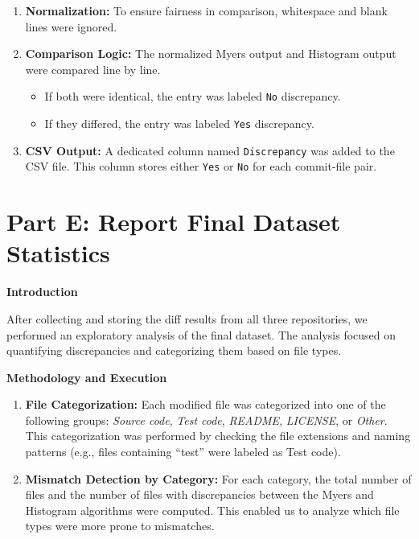 \documentclass[12pt, a4paper]{report}
\newcommand{\sectionbar}[1]{%
  \vspace{0.6\baselineskip}%
  \noindent
  \colorbox{sectionbar}{%
    \parbox{\dimexpr\linewidth-2\fboxsep\relax}{%
      \textbf{\Large\textsf{#1}}%
    }%
  }%
  \vspace{0.6\baselineskip}
}
\begin{document}
\begin{enumerate}
    \item \textbf{Normalization:}  
    To ensure fairness in comparison, whitespace and blank lines were ignored.

    \item \textbf{Comparison Logic:}  
    The normalized Myers output and Histogram output were compared line by line.  
    \begin{itemize}
        \item If both were identical, the entry was labeled \texttt{No} discrepancy.  
        \item If they differed, the entry was labeled \texttt{Yes} discrepancy.  
    \end{itemize}

    \item \textbf{CSV Output:}  
    A dedicated column named \texttt{Discrepancy} was added to the CSV file. This column stores either \texttt{Yes} or \texttt{No} for each commit-file pair.

\end{enumerate}

\section{Part E: Report Final Dataset Statistics}

\sectionbar{Introduction}

After collecting and storing the diff results from all three repositories, we performed an exploratory analysis of the final dataset. The analysis focused on quantifying discrepancies and categorizing them based on file types.

\sectionbar{Methodology and Execution}

\begin{enumerate}
    \item \textbf{File Categorization:}  
        Each modified file was categorized into one of the following groups: 
        \textit{Source code}, \textit{Test code}, \textit{README}, \textit{LICENSE}, or \textit{Other}.  
        This categorization was performed by checking the file extensions and naming patterns (e.g., files containing ``test'' were labeled as Test code).

    \item \textbf{Mismatch Detection by Category:}  
        For each category, the total number of files and the number of files with discrepancies between the Myers and Histogram algorithms were computed. This enabled us to analyze which file types were more prone to mismatches.
\end{enumerate}
\end{document}
